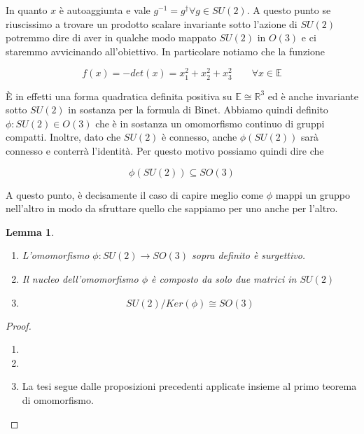\documentclass[11pt]{article}
\theoremstyle{plain}
\newtheorem{lemma}[thm]{Lemma}
\theoremstyle{definition}
\theoremstyle{remark}
\newcommand{\R}{\mathbb{R}}
\begin{document}
 In quanto $x$ è autoaggiunta e vale $g^{-1} = g^\dag \forall g \in SU(2)$. A questo punto se riuscissimo a trovare un prodotto scalare invariante sotto l'azione di $SU(2)$ potremmo dire di aver in qualche modo mappato $SU(2)$ in $O(3)$ e ci staremmo avvicinando all'obiettivo. In particolare notiamo che la funzione

 \[ f(x) = -det (x) = x_1 ^2 + x_2^2 + x_3^2 \qquad \forall x \in \mathbb{E}\]

 È in effetti una forma quadratica definita positiva su $\mathbb{E} \cong \R^3$ ed è anche invariante sotto $SU(2)$ in sostanza per la formula di Binet. Abbiamo quindi definito $\phi: SU(2) \in O(3)$ che è in sostanza un omomorfismo continuo di gruppi compatti. Inoltre, dato che $SU(2)$ è connesso, anche $\phi(SU(2))$ sarà connesso e conterrà l'identità. Per questo motivo possiamo quindi dire che

 \[ \phi(SU(2)) \subseteq SO(3) \] 

 A questo punto, è decisamente il caso di capire meglio come $\phi$ mappi un gruppo nell'altro in modo da sfruttare quello che sappiamo per uno anche per l'altro.



\begin{lemma}
  \begin{enumerate}
    \item L'omomorfismo $\phi : SU(2) \to SO(3)$ sopra definito è surgettivo. 
    \item Il nucleo dell'omomorfismo $\phi$ è composto da solo due matrici in $SU(2)$
    \item
      \[ SU(2) / Ker(\phi) \cong SO(3) \]
  \end{enumerate}
  \end{lemma}

 \begin{proof}
   \begin{enumerate}
     \item{}
     \item{}
     \item La tesi segue dalle proposizioni precedenti applicate insieme al primo teorema di omomorfismo.
   \end{enumerate}
   \end{proof}
 
\end{document}
